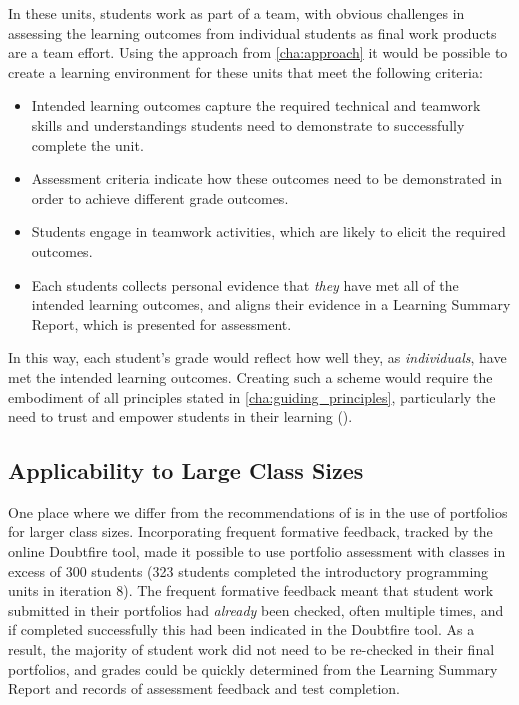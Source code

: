 In these units, students work as part of a team, with obvious challenges in assessing the learning outcomes from individual students as final work products are a team effort. Using the approach from \cref{cha:approach} it would be possible to create a learning environment for these units that meet the following criteria:
\begin{itemize}[noitemsep,nolistsep]
	\item Intended learning outcomes capture the required technical and teamwork skills and understandings students need to demonstrate to successfully complete the unit.
	\item Assessment criteria indicate how these outcomes need to be demonstrated in order to achieve different grade outcomes.
	\item Students engage in teamwork activities, which are likely to elicit the required outcomes.
	\item Each students collects personal evidence that \emph{they} have met all of the intended learning outcomes, and aligns their evidence in a Learning Summary Report, which is presented for assessment.
\end{itemize}

In this way, each student's grade would reflect how well they, as \emph{individuals}, have met the intended learning outcomes. Creating such a scheme would require the embodiment of all principles stated in \cref{cha:guiding_principles}, particularly the need to trust and empower students in their learning ().

\subsection{Applicability to Large Class Sizes} %
\label{sub:appli}


One place where we differ from the recommendations of \citet{Biggs:2007} is in the use of portfolios for larger class sizes. Incorporating frequent formative feedback, tracked by the online Doubtfire tool, made it possible to use portfolio assessment with classes in excess of 300 students (323 students completed the introductory programming units in iteration 8). The frequent formative feedback meant that student work submitted in their portfolios had \emph{already} been checked, often multiple times, and if completed successfully this had been indicated in the Doubtfire tool. As a result, the majority of student work did not need to be re-checked in their final portfolios, and grades could be quickly determined from the Learning Summary Report and records of assessment feedback and test completion.

